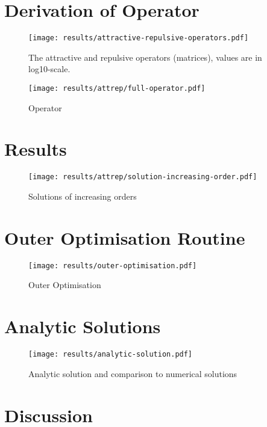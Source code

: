 \section{Derivation of Operator}


\begin{figure}[H]
  \centering
  \label{fig:attractive-repulsive}
  \texttt{[image: results/attractive-repulsive-operators.pdf]}
  \caption{The attractive and repulsive operators (matrices), values are in log10-scale.}
\end{figure}

\begin{figure}[H]
  \centering
  \label{fig:attrep-operator}
  \texttt{[image: results/attrep/full-operator.pdf]}
  \caption{Operator}
\end{figure}

\section{Results}
\begin{figure}[H]
  \centering
  \label{fig:solution-increasing-order}
  \texttt{[image: results/attrep/solution-increasing-order.pdf]}
  \caption{Solutions of increasing orders}
\end{figure}

\section{Outer Optimisation Routine}

\begin{figure}[H]
  \centering
  \label{fig:outer-optimisation}
  \texttt{[image: results/outer-optimisation.pdf]}
  \caption{Outer Optimisation}
\end{figure}

\section{Analytic Solutions}
\begin{figure}[H]
  \centering
  \label{fig:analytic-solution}
  \texttt{[image: results/analytic-solution.pdf]}
  \caption{Analytic solution and comparison to numerical solutions}
\end{figure}

\section{Discussion}


